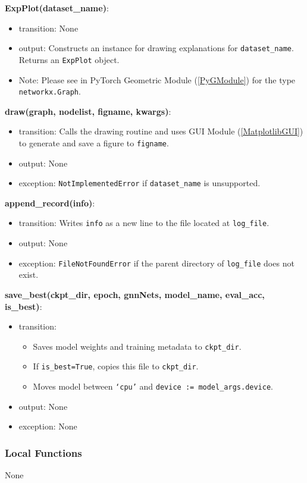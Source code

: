 \documentclass[12pt, titlepage]{article}
\begin{document}
\noindent \textbf{ExpPlot(dataset\_name)}:
\begin{itemize}
  \item transition: None
  \item output: Constructs an instance for drawing explanations for \texttt{dataset\_name}. Returns an \texttt{ExpPlot} object.
  \item Note: Please see in PyTorch Geometric Module (\ref{PyGModule}) for the type \texttt{networkx.Graph}.
\end{itemize}

\noindent \textbf{draw(graph, nodelist, figname, kwargs)}:
\begin{itemize}
  \item transition: Calls the drawing routine and uses GUI Module (\ref{MatplotlibGUI}) to generate and save a figure to \texttt{figname}.
  \item output: None
  \item exception: \texttt{NotImplementedError} if \texttt{dataset\_name} is unsupported.
\end{itemize}

\noindent \textbf{append\_record(info)}:
\begin{itemize}
  \item transition: Writes \texttt{info} as a new line to the file located at \texttt{log\_file}.
  \item output: None
  \item exception: \texttt{FileNotFoundError} if the parent directory of \texttt{log\_file} does not exist.
\end{itemize}

\noindent \textbf{save\_best(ckpt\_dir, epoch, gnnNets, model\_name, eval\_acc, is\_best)}:
\begin{itemize}
  \item transition:
  \begin{itemize}
    \item Saves model weights and training metadata to \texttt{ckpt\_dir}.
    \item If \texttt{is\_best=True}, copies this file to \texttt{ckpt\_dir}.
    \item Moves model between \texttt{`cpu'} and \texttt{device := model\_args.device}.
  \end{itemize}
  \item output: None
  \item exception: None
\end{itemize}

\subsubsection{Local Functions}
None
\end{document}
